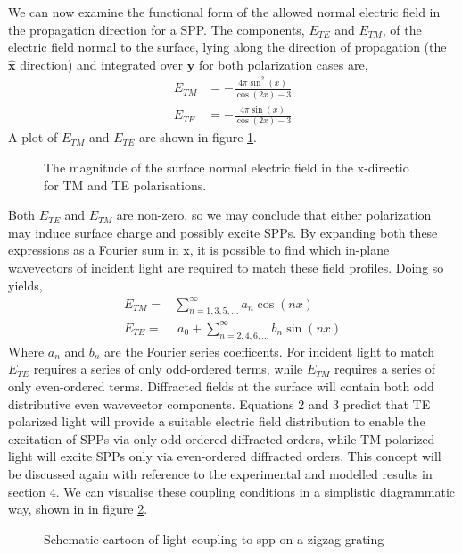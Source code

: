 \documentclass[oneside,11pt,book]{book}
\begin{document}
We can now examine the functional form of the allowed normal electric field in the propagation direction for a SPP. The components, $E_{TE}$ and $E_{TM}$, of the electric field normal to the surface, lying along the direction of propagation (the $\mathbf{\hat{x}}$ direction) and integrated over $\mathbf{y}$ for both polarization cases are,
\begin{align}
E_{TM}& = -\frac{4\pi \sin^2{(x)}}{\cos{(2x)-3}}\\
E_{TE} &= -\frac{4\pi \sin{(x)}}{\cos{(2x)-3}}
\end{align}
A plot of $E_{TM}$ and $E_{TE}$ are shown in figure \ref{fig:e-te-and-e-tm}. 
\begin{figure}
\begin{center}

\caption{The magnitude of the surface normal electric field in the x-directio for TM and TE polarisations.\label{fig:e-te-and-e-tm}}
\end{center}
\end{figure}
Both $E_{TE}$ and $E_{TM}$ are non-zero, so we may conclude that either polarization may induce surface charge and possibly excite SPPs. By expanding both these expressions as a Fourier sum in x, it is possible to find which in-plane wavevectors of incident light are required to match these field profiles. Doing so yields,
\begin{align}
E_{TM}=&\sum\limits_{n=1,3,5,...}^\infty a_n\cos{(nx)}\\
E_{TE}=&\;a_0+\displaystyle\sum\limits_{n=2,4,6,...}^\infty b_n\sin{(nx)}\label{eq:odd-even-fouriers}
\end{align}
Where $a_n$ and $b_n$ are the Fourier series coefficents. For incident light to match $E_{TE}$ requires a series of only odd-ordered terms, while $E_{TM}$ requires a series of only even-ordered terms. Diffracted fields at the surface will contain both odd distributive even wavevector components. Equations 2 and 3 predict that TE polarized light will provide a suitable electric field distribution to enable the excitation of SPPs via only odd-ordered diffracted orders, while TM polarized light will excite SPPs only via even-ordered diffracted orders.  This concept will be discussed again with reference to the experimental and modelled results in section 4.
We can visualise these coupling conditions in a simplistic diagrammatic way, shown in in figure \ref{fig:coupling-cartoon}.
\begin{figure}
\begin{center}

\caption{Schematic cartoon of light coupling to spp on a zigzag grating\label{fig:coupling-cartoon}}
\end{center}
\end{figure}
\end{document}
